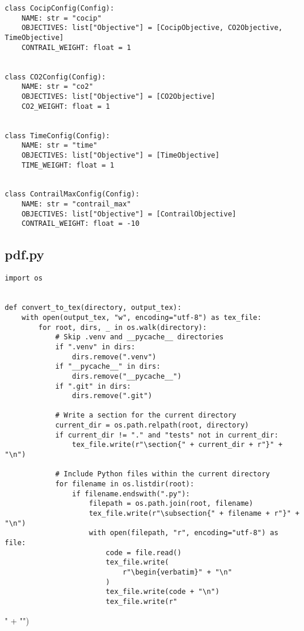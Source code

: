 \begin{verbatim}
class CocipConfig(Config):
    NAME: str = "cocip"
    OBJECTIVES: list["Objective"] = [CocipObjective, CO2Objective, TimeObjective]
    CONTRAIL_WEIGHT: float = 1


class CO2Config(Config):
    NAME: str = "co2"
    OBJECTIVES: list["Objective"] = [CO2Objective]
    CO2_WEIGHT: float = 1


class TimeConfig(Config):
    NAME: str = "time"
    OBJECTIVES: list["Objective"] = [TimeObjective]
    TIME_WEIGHT: float = 1


class ContrailMaxConfig(Config):
    NAME: str = "contrail_max"
    OBJECTIVES: list["Objective"] = [ContrailObjective]
    CONTRAIL_WEIGHT: float = -10

\end{verbatim}
\subsection{pdf.py}
\begin{verbatim}
import os


def convert_to_tex(directory, output_tex):
    with open(output_tex, "w", encoding="utf-8") as tex_file:
        for root, dirs, _ in os.walk(directory):
            # Skip .venv and __pycache__ directories
            if ".venv" in dirs:
                dirs.remove(".venv")
            if "__pycache__" in dirs:
                dirs.remove("__pycache__")
            if ".git" in dirs:
                dirs.remove(".git")

            # Write a section for the current directory
            current_dir = os.path.relpath(root, directory)
            if current_dir != "." and "tests" not in current_dir:
                tex_file.write(r"\section{" + current_dir + r"}" + "\n")

            # Include Python files within the current directory
            for filename in os.listdir(root):
                if filename.endswith(".py"):
                    filepath = os.path.join(root, filename)
                    tex_file.write(r"\subsection{" + filename + r"}" + "\n")
                    with open(filepath, "r", encoding="utf-8") as file:
                        code = file.read()
                        tex_file.write(
                            r"\begin{verbatim}" + "\n"
                        )
                        tex_file.write(code + "\n")
                        tex_file.write(r"\end{verbatim}" + "\n")

